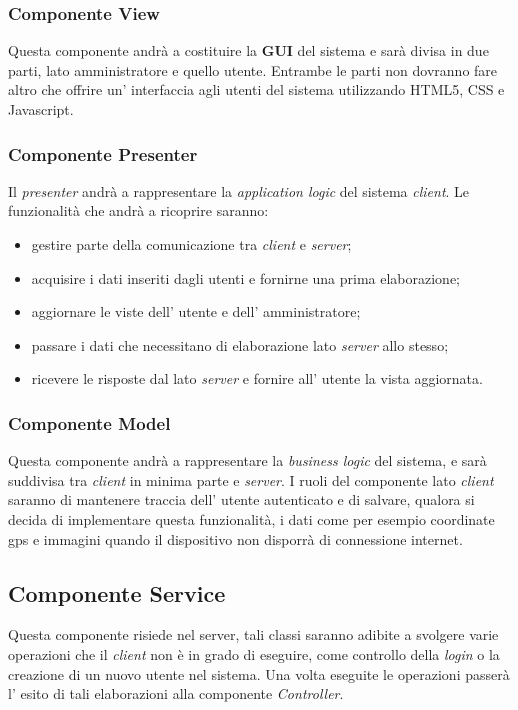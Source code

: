 \subsubsection{Componente View}
Questa componente andrà a costituire la \textbf{GUI} del sistema e sarà divisa in due parti, lato amministratore e quello utente. Entrambe le parti non dovranno fare altro che offrire un' interfaccia agli utenti del sistema utilizzando HTML5, CSS e Javascript.
\subsubsection{Componente Presenter}
Il \textit{presenter} andrà a rappresentare la \textit{application logic} del sistema \textit{client}. Le funzionalità che andrà a ricoprire saranno:
\begin{itemize}
	\item gestire parte della comunicazione tra \textit{client} e \textit{server};
	\item acquisire i dati inseriti dagli utenti e fornirne una prima elaborazione;
	\item aggiornare le viste dell' utente e dell' amministratore;
	\item passare i dati che necessitano di elaborazione lato \textit{server} allo stesso;
	\item ricevere le risposte dal lato \textit{server} e fornire all' utente la vista aggiornata.
\end{itemize}
\subsubsection{Componente Model}
Questa componente andrà a rappresentare la \textit{business logic} del sistema, e sarà suddivisa tra \textit{client} in minima parte e \textit{server}.
I ruoli del componente lato \textit{client} saranno di mantenere traccia dell' utente autenticato e di salvare, qualora si decida di implementare questa funzionalità, i dati come per esempio coordinate gps e immagini quando il dispositivo non disporrà di connessione internet.
\subsection{Componente Service}
Questa componente risiede nel server, tali classi saranno adibite a svolgere varie operazioni che il \textit{client} non è in grado di eseguire, come controllo della \textit{login} o la creazione di un nuovo utente nel sistema. Una volta eseguite le operazioni passerà l' esito di tali elaborazioni alla componente \textit{Controller}.
